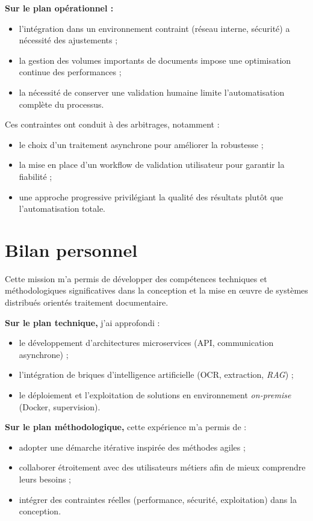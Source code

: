 \documentclass[12pt,a4paper]{report}
\begin{document}
\textbf{Sur le plan opérationnel :}
\begin{itemize}
  \item l’intégration dans un environnement contraint (réseau interne, sécurité) a nécessité des ajustements ;
  \item la gestion des volumes importants de documents impose une optimisation continue des performances ;
  \item la nécessité de conserver une validation humaine limite l’automatisation complète du processus.
\end{itemize}

Ces contraintes ont conduit à des arbitrages, notamment :
\begin{itemize}
  \item le choix d’un traitement asynchrone pour améliorer la robustesse ;
  \item la mise en place d’un workflow de validation utilisateur pour garantir la fiabilité ;
  \item une approche progressive privilégiant la qualité des résultats plutôt que l’automatisation totale.
\end{itemize}

\section{Bilan personnel}
Cette mission m’a permis de développer des compétences techniques et méthodologiques significatives dans la conception et la mise en œuvre de systèmes distribués orientés traitement documentaire.

\textbf{Sur le plan technique,} j’ai approfondi :
\begin{itemize}
  \item le développement d’architectures microservices (API, communication asynchrone) ;
  \item l’intégration de briques d’intelligence artificielle (OCR, extraction, \textit{RAG}) ;
  \item le déploiement et l’exploitation de solutions en environnement \textit{on-premise} (Docker, supervision).
\end{itemize}

\textbf{Sur le plan méthodologique,} cette expérience m’a permis de :
\begin{itemize}
  \item adopter une démarche itérative inspirée des méthodes agiles ;
  \item collaborer étroitement avec des utilisateurs métiers afin de mieux comprendre leurs besoins ;
  \item intégrer des contraintes réelles (performance, sécurité, exploitation) dans la conception.
\end{itemize}
\end{document}

